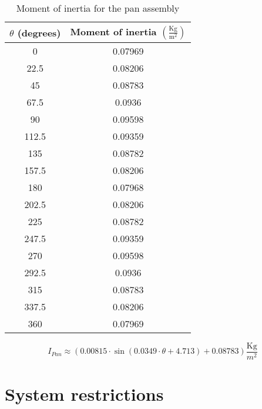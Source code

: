 \documentclass{article}
\begin{document}
\begin{table}[H]
\centering
    \begin{tabular}{|c|c|}\hline
    \textbf{$\theta$ (degrees)}& \textbf{Moment of inertia $\left(\frac{\mathrm{Kg}}{\mathrm{m^2}}\right)$}\\\hline\hline
    0     & 0.07969 \\  \hline
    22.5  & 0.08206 \\  \hline
    45    & 0.08783 \\  \hline
    67.5  & 0.0936  \\  \hline
    90    & 0.09598 \\  \hline
    112.5 & 0.09359 \\  \hline
    135   & 0.08782 \\  \hline
    157.5 & 0.08206 \\  \hline
    180   & 0.07968 \\  \hline
    202.5 & 0.08206 \\  \hline
    225   & 0.08782 \\  \hline
    247.5 & 0.09359 \\  \hline
    270   & 0.09598 \\  \hline
    292.5 & 0.0936  \\  \hline
    315   & 0.08783 \\  \hline
    337.5 & 0.08206 \\  \hline
    360   & 0.07969 \\  \hline
    \end{tabular}
\caption{Moment of inertia for the pan assembly}
\label{ta:Inertia_PAN}
\end{table}

\begin{equation}\label{eq:I_pan}
    I_{Pan} \approx \left(0.00815\cdot\sin\left(0.0349\cdot \theta + 4.713\right)+0.08783\right) \frac{\mathrm{Kg}}{m^2}
\end{equation}

\section{System restrictions}
\end{document}

